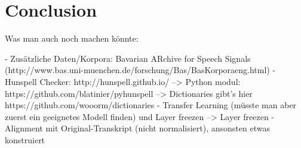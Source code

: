 \section{Conclusion}\label{conclusion}

Was man auch noch machen könnte:

- Zusätzliche Daten/Korpora: Bavarian ARchive for Speech Signals (http://www.bas.uni-muenchen.de/forschung/Bas/BasKorporaeng.html)
- Hunspell Checker: http://hunspell.github.io/
  --> Python modul: https://github.com/blatinier/pyhunspell
  --> Dictionaries gibt's hier https://github.com/wooorm/dictionaries
- Transfer Learning (müsste man aber zuerst ein geeignetes Modell finden) und Layer freezen
 --> Layer freezen
- Alignment mit Original-Transkript (nicht normalisiert), ansonsten etwas konstruiert